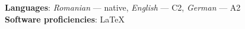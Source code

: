 
\smallskip
{}%
\textbf{Languages}: \emph{Romanian} --- native, \emph{English} --- C2, \emph{German} --- A2\\
\textbf{Software proficiencies}: \LaTeX
